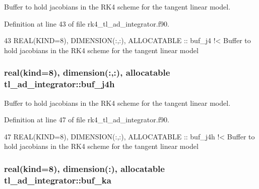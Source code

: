 Buffer to hold jacobians in the R\+K4 scheme for the tangent linear model. 



Definition at line 43 of file rk4\+\_\+tl\+\_\+ad\+\_\+integrator.\+f90.


\begin{DoxyCode}
43   \textcolor{keywordtype}{REAL(KIND=8)}, \textcolor{keywordtype}{DIMENSION(:,:)}, \textcolor{keywordtype}{ALLOCATABLE} :: buf\_j4\textcolor{comment}{ !< Buffer to hold jacobians in the RK4 scheme for the
       tangent linear model}
\end{DoxyCode}
\subsubsection[{\texorpdfstring{buf\+\_\+j4h}{buf_j4h}}]{\setlength{\rightskip}{0pt plus 5cm}real(kind=8), dimension(\+:,\+:), allocatable tl\+\_\+ad\+\_\+integrator\+::buf\+\_\+j4h\hspace{0.3cm}{\ttfamily [private]}}\hypertarget{namespacetl__ad__integrator_a99c2747c1997b622f4ab6170e3a8f23d}{}\label{namespacetl__ad__integrator_a99c2747c1997b622f4ab6170e3a8f23d}


Buffer to hold jacobians in the R\+K4 scheme for the tangent linear model. 



Definition at line 47 of file rk4\+\_\+tl\+\_\+ad\+\_\+integrator.\+f90.


\begin{DoxyCode}
47   \textcolor{keywordtype}{REAL(KIND=8)}, \textcolor{keywordtype}{DIMENSION(:,:)}, \textcolor{keywordtype}{ALLOCATABLE} :: buf\_j4h\textcolor{comment}{ !< Buffer to hold jacobians in the RK4 scheme for
       the tangent linear model}
\end{DoxyCode}
\subsubsection[{\texorpdfstring{buf\+\_\+ka}{buf_ka}}]{\setlength{\rightskip}{0pt plus 5cm}real(kind=8), dimension(\+:), allocatable tl\+\_\+ad\+\_\+integrator\+::buf\+\_\+ka\hspace{0.3cm}{\ttfamily [private]}}\hypertarget{namespacetl__ad__integrator_a879cc86c1e268775237b6776a4ff7d32}{}\label{namespacetl__ad__integrator_a879cc86c1e268775237b6776a4ff7d32}


